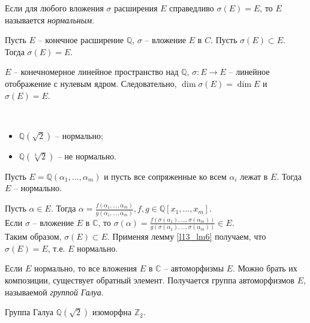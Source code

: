 \begin{definition}
	Если для любого вложения $\sigma$ расширения $E$ справедливо $\sigma(E) = E$, то $E$ называется \textit{нормальным}.
\end{definition}

\begin{lemma} \label{l13_lm6}
	Пусть $E$ -- конечное расширение $\mathbb{Q}$, $\sigma$ -- вложение $E$ в $C$. Пусть $\sigma(E) \subset E$. Тогда $\sigma(E) = E$.
\end{lemma}

\begin{pf}
	$E$ -- конечномерное линейное пространство над $\mathbb{Q}$, $\sigma: E \rightarrow E$ -- линейное отображение с нулевым ядром. Следовательно, $\dim \sigma(E) = \dim E$ и $\sigma(E) = E$.
\end{pf}

\begin{example}~\
	\begin{itemize}[nolistsep]
		\item $\mathbb{Q}(\sqrt{2})$ -- нормально;
		\item $\mathbb{Q}(\sqrt[3]{2})$ -- не нормально.
	\end{itemize}
\end{example}

\begin{theorem} \label{l13_th8}
	Пусть $E = \mathbb{Q}(\alpha_1, \ldots, \alpha_m)$ и пусть все сопряженные ко всем $\alpha_i$ лежат в $E$. Тогда $E$ -- нормально.
\end{theorem}
\begin{pf}
	Пусть $\alpha \in E$. Тогда $\alpha = \frac{f(\alpha_1, \ldots, \alpha_m)}{g(\alpha_1, \ldots, \alpha_m)}, f, g \in \mathbb{Q}[x_1, \ldots, x_m]$.\\
	Если $\sigma$ -- вложение $E$ в $\mathbb{C}$, то $\sigma(\alpha) = \frac{f(\sigma(\alpha_1), \ldots, \sigma(\alpha_m))}{g(\sigma(\alpha_1), \ldots, \sigma(\alpha_m))} \in E$.\\
	Таким образом, $\sigma(E) \subset E$. Применяя лемму \ref{l13_lm6} получаем, что $\sigma(E) = E$, т.е. $E$ нормально. 
\end{pf}

Если $E$ нормально, то все вложения $E$ в $\mathbb{C}$ -- автоморфизмы $E$. Можно брать их композиции, существует обратный элемент. Получается группа автоморфизмов $E$, называемой \textit{группой Галуа}.
\begin{example}
	Группа Галуа $\mathbb{Q}(\sqrt{2})$ изоморфна $\mathbb{Z}_2$.
\end{example}

